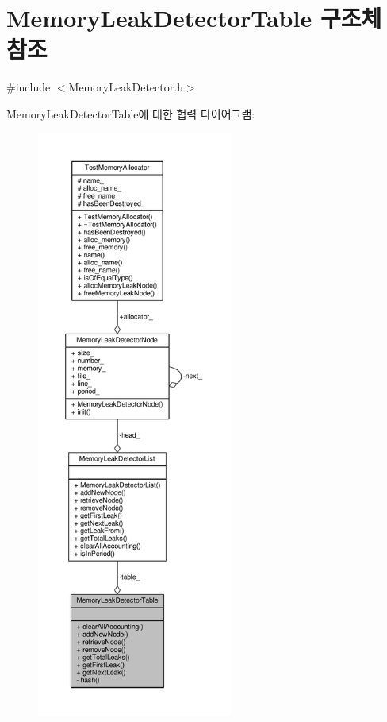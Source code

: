 \hypertarget{struct_memory_leak_detector_table}{}\section{Memory\+Leak\+Detector\+Table 구조체 참조}
\label{struct_memory_leak_detector_table}


{\ttfamily \#include $<$Memory\+Leak\+Detector.\+h$>$}



Memory\+Leak\+Detector\+Table에 대한 협력 다이어그램\+:
\nopagebreak
\begin{figure}[H]
\begin{center}
\leavevmode
\includegraphics[height=550pt]{struct_memory_leak_detector_table__coll__graph}
\end{center}
\end{figure}
